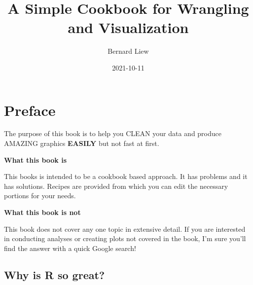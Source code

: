 \documentclass[
]{book}
\title{A Simple Cookbook for Wrangling and Visualization}
\author{Bernard Liew}
\date{2021-10-11}
\begin{document}
\maketitle

{
\setcounter{tocdepth}{1}
\tableofcontents
}
\hypertarget{intro}{%
\chapter{Preface}\label{intro}}

The purpose of this book is to help you CLEAN your data and produce AMAZING graphics \textbf{EASILY} but not fast at first.

\textbf{What this book is}

This books is intended to be a cookbook based approach. It has problems and it has solutions. Recipes are provided from which you can edit the necessary portions for your needs.

\textbf{What this book is not}

This book does not cover any one topic in extensive detail. If you are interested in conducting analyses or creating plots not covered in the book, I'm sure you'll find the answer with a quick Google search!

\hypertarget{why-is-r-so-great}{%
\section{Why is R so great?}\label{why-is-r-so-great}}
\end{document}
